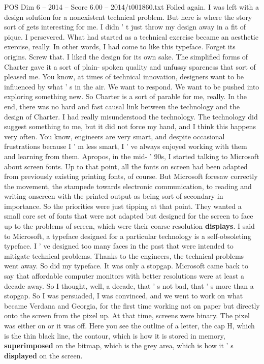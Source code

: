 \begin{textsample}{POS Dim 6 – 2014 – Score 6.00 – 2014/t001860.txt}
Foiled again.
I was left with a design solution for a nonexistent technical problem.
But here is where the story sort of gets interesting for me.
I didn ' t just throw my design away in a fit of pique.
I persevered.
What had started as a technical exercise became an aesthetic exercise, really.
In other words, I had come to like this typeface.
Forget its origins.
Screw that.
I liked the design for its own sake.
The simplified forms of Charter gave it a sort of plain- spoken quality and unfussy spareness that sort of pleased me.
You know, at times of technical innovation, designers want to be influenced by what ' s in the air.
We want to respond.
We want to be pushed into exploring something new.
So Charter is a sort of parable for me, really.
In the end, there was no hard and fast causal link between the technology and the design of Charter.
I had really misunderstood the technology.
The technology did suggest something to me, but it did not force my hand, and I think this happens very often.
You know, engineers are very smart, and despite occasional frustrations because I ' m less smart, I ' ve always enjoyed working with them and learning from them.
Apropos, in the mid- ' 90s, I started talking to Microsoft about screen fonts.
Up to that point, all the fonts on screen had been adapted from previously existing printing fonts, of course.
But Microsoft foresaw correctly the movement, the stampede towards electronic communication, to reading and writing onscreen with the printed output as being sort of secondary in importance.
So the priorities were just tipping at that point.
They wanted a small core set of fonts that were not adapted but designed for the screen to face up to the problems of screen, which were their coarse resolution \textbf{displays}.
I said to Microsoft, a typeface designed for a particular technology is a self-obsoleting typeface.
I ' ve designed too many faces in the past that were intended to mitigate technical problems.
Thanks to the engineers, the technical problems went away.
So did my typeface.
It was only a stopgap.
Microsoft came back to say that affordable computer monitors with better resolutions were at least a decade away.
So I thought, well, a decade, that ' s not bad, that ' s more than a stopgap.
So I was persuaded, I was convinced, and we went to work on what became Verdana and Georgia, for the first time working not on paper but directly onto the screen from the pixel up.
At that time, screens were binary.
The pixel was either on or it was off.
Here you see the outline of a letter, the cap H, which is the thin black line, the contour, which is how it is stored in memory, \textbf{superimposed} on the bitmap, which is the grey area, which is how it ' s \textbf{displayed} on the screen.

\end{textsample}
